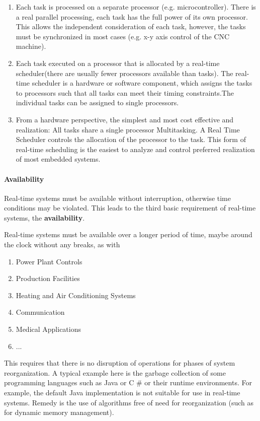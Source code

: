 \begin{enumerate}
	\item  Each task is processed on a separate processor (e.g. microcontroller). There is a real parallel processing, each task has the full power of its own processor. This allows the independent consideration of each task, however, the tasks must be synchronized in most cases (e.g. x-y axis control of the CNC machine).
	\item  Each task executed on a processor that is allocated by a real-time scheduler(there are usually fewer processors available than tasks). The real-time scheduler is a hardware or software component, which assigns the tasks to processors such that all tasks can meet their timing constraints.The individual tasks can be assigned to single processors.
	\item  From a hardware perspective, the simplest and most cost effective and realization: All tasks share a single processor Multitasking. A Real Time Scheduler controls the allocation of the processor to the task. This form of real-time scheduling is the easiest to analyze and control  preferred realization of most embedded systems.
\end{enumerate}

\paragraph{  Availability}

Real-time systems must be available without interruption, otherwise time conditions may be violated. This leads to the third basic requirement of real-time systems, the \textbf{availability}. 

Real-time systems must be available over a longer period of time, maybe around the clock without any breaks, as with

\begin{enumerate}
	\item  Power Plant Controls
	\item  Production Facilities
	\item  Heating and Air Conditioning Systems
	\item  Communication
	\item  Medical Applications 
	\item  ...
\end{enumerate}

This requires that there is no disruption of operations for phases of system reorganization. A typical example here is the garbage collection of some programming languages such as Java or C \# or their runtime environments. For example, the default Java implementation is not suitable for use in real-time systems. Remedy is the use of algorithms free of need for reorganization (such as for dynamic memory management).

